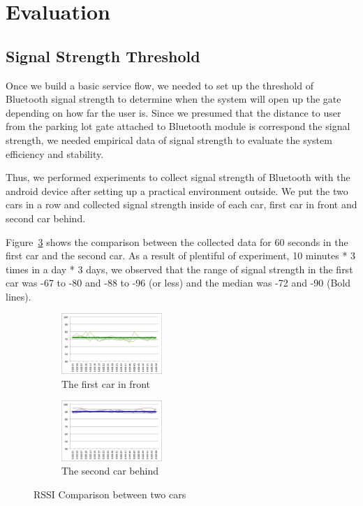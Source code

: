 \section{Evaluation}
\subsection{Signal Strength Threshold}
Once we build a basic service flow, we needed to set up the threshold of Bluetooth signal strength to determine when the system will open up the gate depending on how far the user is. Since we presumed that the distance to user from the parking lot gate attached to Bluetooth module is correspond the signal strength, we needed empirical data of signal strength to evaluate the system efficiency and stability.

Thus, we performed experiments to collect signal strength of Bluetooth with the android device after setting up a practical environment outside. We put the two cars in a row and collected signal strength inside of each car, first car in front and second car behind.

Figure~\ref{fig:comparison} shows the comparison between the collected data for 60 seconds in the first car and the second car. As a result of plentiful of experiment, 10 minutes * 3 times in a day * 3 days, we observed that the range of signal strength in the first car was -67 to -80 and -88 to -96 (or less) and the median was -72 and -90 (Bold lines).

\begin{figure}
	\centering
	\begin{subfigure}[b]{.5\linewidth}
		\centering
		\includegraphics[width=1.5in]{figure/bt_first_car}
		\caption{The first car in front}
		\label{fig:first car}
	\end{subfigure}%
	\begin{subfigure}[b]{.5\linewidth}
		\centering
		\includegraphics[width=1.5in]{figure/bt_second_car}
		\caption{The second car behind}
		\label{fig:second car}
	\end{subfigure}
	\caption{RSSI Comparison between two cars}
	\label{fig:comparison}
\end{figure}

